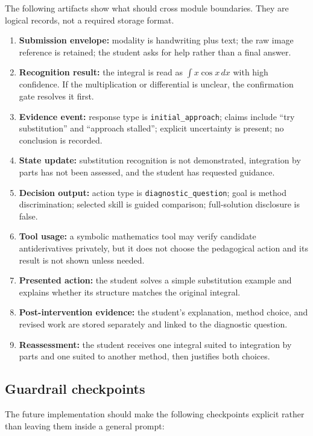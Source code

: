 \documentclass[11pt]{article}
\begin{document}
The following artifacts show what should cross module boundaries. They are logical records, not a required storage format.

\begin{enumerate}
    \item \textbf{Submission envelope:} modality is handwriting plus text; the raw image reference is retained; the student asks for help rather than a final answer.
    \item \textbf{Recognition result:} the integral is read as $\int x\cos x\,dx$ with high confidence. If the multiplication or differential is unclear, the confirmation gate resolves it first.
    \item \textbf{Evidence event:} response type is \texttt{initial\_approach}; claims include ``try substitution'' and ``approach stalled''; explicit uncertainty is present; no conclusion is recorded.
    \item \textbf{State update:} substitution recognition is not demonstrated, integration by parts has not been assessed, and the student has requested guidance.
    \item \textbf{Decision output:} action type is \texttt{diagnostic\_question}; goal is method discrimination; selected skill is guided comparison; full-solution disclosure is false.
    \item \textbf{Tool usage:} a symbolic mathematics tool may verify candidate antiderivatives privately, but it does not choose the pedagogical action and its result is not shown unless needed.
    \item \textbf{Presented action:} the student solves a simple substitution example and explains whether its structure matches the original integral.
    \item \textbf{Post-intervention evidence:} the student's explanation, method choice, and revised work are stored separately and linked to the diagnostic question.
    \item \textbf{Reassessment:} the student receives one integral suited to integration by parts and one suited to another method, then justifies both choices.
\end{enumerate}

\subsection{Guardrail checkpoints}

The future implementation should make the following checkpoints explicit rather than leaving them inside a general prompt:
\end{document}
